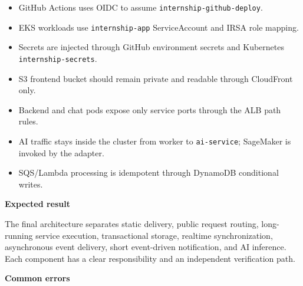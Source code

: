 \begin{itemize}
\tightlist
\item
  GitHub Actions uses OIDC to assume \texttt{internship-\allowbreak{}github-\allowbreak{}deploy}.
\item
  EKS workloads use \texttt{internship-\allowbreak{}app} ServiceAccount and IRSA role
  mapping.
\item
  Secrets are injected through GitHub environment secrets and Kubernetes
  \texttt{internship-\allowbreak{}secrets}.
\item
  S3 frontend bucket should remain private and readable through
  CloudFront only.
\item
  Backend and chat pods expose only service ports through the ALB path
  rules.
\item
  AI traffic stays inside the cluster from worker to
  \texttt{ai-\allowbreak{}service}; SageMaker is invoked by the adapter.
\item
  SQS/Lambda processing is idempotent through DynamoDB conditional
  writes.
\end{itemize}

\vspace{0.5em}\noindent\textbf{Expected result}\par

The final architecture separates static delivery, public request
routing, long-running service execution, transactional storage, realtime
synchronization, asynchronous event delivery, short event-driven
notification, and AI inference. Each component has a clear
responsibility and an independent verification path.

\vspace{0.5em}\noindent\textbf{Common errors}\par

